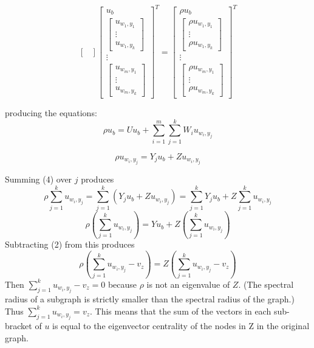 \documentclass{paper}
\begin{document}
\[\begin{bmatrix}
\end{bmatrix}
 \begin{bmatrix}u_b \\
\begin{bmatrix} u_{w_1,y_1} \\ \vdots \\ u_{w_1,y_k}   \end{bmatrix} \\
\vdots \\
\begin{bmatrix} u_{w_m,y_1}  \\ \vdots \\ u_{w_m,y_k}   \end{bmatrix}
\end{bmatrix}^T
=
 \begin{bmatrix}\rho u_b \\
\begin{bmatrix} \rho u_{w_1,y_1} \\ \vdots \\ \rho u_{w_1,y_k}   \end{bmatrix} \\
\vdots \\
\begin{bmatrix} \rho u_{w_m,y_1}  \\ \vdots \\ \rho u_{w_m,y_k}   \end{bmatrix}
\end{bmatrix}^T
\]

producing the equations:
\begin{equation}
\rho u_b = Uu_b +\sum_{i=1}^{m}\sum_{j=1}^{k}W_iu_{w_i,y_j}
\end{equation}

\begin{equation}
\rho u_{w_i,y_j} = Y_ju_b +Zu_{w_i,y_j}
\end{equation}

Summing (4) over $j$ produces
\[
\rho \sum_{j=1}^{k} u_{w_i,y_j}
=
\sum_{j=1}^{k} (Y_ju_b +Zu_{w_i,y_j})
= \sum_{j=1}^{k} Y_ju_b + Z \sum_{j=1}^{k} u_{w_i,y_j}
\]
\[
\rho( \sum_{j=1}^{k} u_{w_i,y_j} )
= Yu_b + Z(\sum_{j=1}^{k} u_{w_i,y_j})
\]
Subtracting (2) from this produces
\[
\rho( \sum_{j=1}^{k} u_{w_i,y_j} - v_z)
= Z(\sum_{j=1}^{k} u_{w_i,y_j} - v_z)
\]
Then $\sum_{j=1}^{k} u_{w_i,y_j} - v_z = 0 $ because $\rho$ is not an eigenvalue of $Z$. (The spectral radius of a subgraph is strictly smaller than the spectral radius of the graph.)
Thus $\sum_{j=1}^{k} u_{w_i,y_j} = v_z$. This means that the sum of the vectors in each sub-bracket of $u$ is equal to the eigenvector centrality of the nodes in Z in the original graph.
\end{document}
